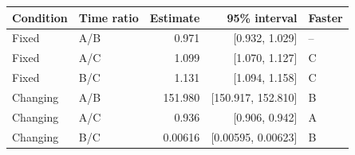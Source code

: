 \begin{tabular}{@{}llrrl@{}}
\toprule
Condition & Time ratio & Estimate & 95\% interval & Faster \\
\midrule
Fixed & A/B & 0.971 & [0.932, 1.029] & -- \\
Fixed & A/C & 1.099 & [1.070, 1.127] & C \\
Fixed & B/C & 1.131 & [1.094, 1.158] & C \\
Changing & A/B & 151.980 & [150.917, 152.810] & B \\
Changing & A/C & 0.936 & [0.906, 0.942] & A \\
Changing & B/C & 0.00616 & [0.00595, 0.00623] & B \\
\bottomrule
\end{tabular}
